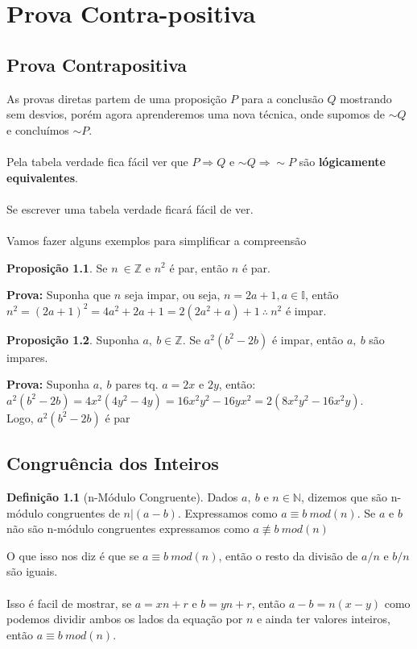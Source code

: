 \documentclass[a4paper,11pt,oneside]{book}
\theoremstyle{definition}
\theoremstyle{break}
\newtheorem{definition}{Definição}[section]
\newtheorem{proposition}{Proposição}
\begin{document}
\chapter{Prova Contra-positiva}
\section{Prova Contrapositiva}
As provas diretas partem de uma proposição $P$ para a conclusão $Q$ mostrando sem desvios, porém agora aprenderemos uma nova técnica, onde supomos de $\sim Q$ e concluímos $\sim P$.
\\
\\
Pela tabela verdade fica fácil ver que $P \Rightarrow Q$ e $ \sim Q \Rightarrow \sim P$ são \textbf{lógicamente equivalentes}. \\ \\
Se escrever uma tabela verdade ficará fácil de ver.
\\ \\
Vamos fazer alguns exemplos para simplificar a compreensão
\begin{proposition}
Se $n \ \in  \mathbb{Z}$ e $n^2$ é par, então $n$ é par.
\end{proposition}
\textbf{Prova:} Suponha que $n$ seja impar, ou seja, $n = 2a+1, a \in \mathbb{I}$, então \\ $n^2 = (2a +1)^2 = 4a^2 +2a + 1 = 2(2a^2 + a) + 1 \ \therefore \ n^2$ é impar.
\begin{proposition}
Suponha $a, \ b \in \mathbb{Z}$. Se $a^2(b^2 -2b)$ é impar, então $a, \ b$ são impares.
\end{proposition}
\textbf{Prova:} Suponha $a, \ b$ pares tq. $a = 2x$ e $2y$, então:\\
$a^2(b^2 -2b) = 4x^2(4y^2 - 4y) = 16x^2y^2 -16yx^2 = 2(8x^2y^2 -16x^2y)$.\\
Logo, $a^2(b^2 -2b)$ é par

\section{Congruência dos Inteiros}
\begin{definition}[n-Módulo Congruente]
Dados $a, \ b $ e $n \in \mathbb{N}$, dizemos que são n-módulo congruentes de $n | (a-b)$. Expressamos como $ a \equiv b \ mod(n)$. Se $a$ e $b$ não são n-módulo congruentes expressamos como $a \not\equiv  b \ mod(n)$
\end{definition}
O que isso nos diz é que se $a \equiv b \ mod(n)$, então o resto da divisão de $a/n$ e $b/n$ são iguais. \\ \\
Isso é facil de mostrar, se $a = xn + r$ e $b = yn + r$, então $a-b = n(x-y)$ como podemos dividir ambos os lados da equação por $n$ e ainda ter valores inteiros, então $a \equiv b \ mod(n)$.
\end{document}
